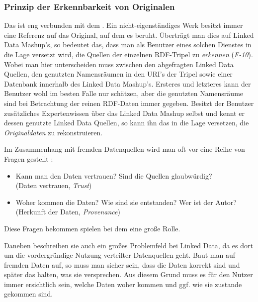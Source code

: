 \documentclass[11pt]{article}
\newcommand{\com}[1]{\marginpar{\em {\small{#1}}}} %
\begin{document}
%
%
\subsubsection{Prinzip der Erkennbarkeit von Originalen}
\label{sec:MashupPrinciple-Original}
\label{req:F10source}

Das  ist eng verbunden mit dem . Ein nicht-eigenständiges Werk besitzt immer eine Referenz auf das Original, auf dem es beruht. Überträgt man dies auf Linked Data Mashup's, so bedeutet das, dass man als Benutzer eines solchen Dienstes in die Lage versetzt wird, die Quellen der einzelnen RDF-Tripel zu \emph{erkennen} (\textit{F-10})\com{Anforderung \\ F-10, S. \pageref{req:F10}}. Wobei man hier unterscheiden muss zwischen den abgefragten Linked Data Quellen, den genutzten Namensräumen in den URI's der Tripel sowie einer Datenbank innerhalb des Linked Data Mashup's. Ersteres und letzteres kann der Benutzer wohl im besten Falle nur schätzen, aber die genutzten Namensräume sind bei Betrachtung der reinen RDF-Daten immer gegeben. Besitzt der Benutzer zusätzliches Expertenwissen über das Linked Data Mashup selbst und kennt er dessen genutzte Linked Data Quellen, so kann ihn das in die Lage versetzen, die \emph{Originaldaten} zu rekonstruieren.

Im Zusammenhang mit fremden Datenquellen wird man oft vor eine Reihe von Fragen gestellt \cite[S. 19]{LINKEDDATA-ABOUT}:

\begin{itemize}
	\item Kann man den Daten vertrauen?\com{Trust} Sind die Quellen glaubwürdig? \\(Daten vertrauen, \textit{Trust})
	\item Woher\com{Provenance} kommen die Daten? Wie sind sie entstanden? Wer ist der Autor? \\(Herkunft der Daten, \textit{Provenance})
\end{itemize} 

\noindent
Diese Fragen bekommen spielen bei dem  eine große Rolle. 


\newpage 
\noindent
Daneben beschreiben sie auch ein großes Problemfeld bei Linked Data, da es dort um die vordergründige Nutzung verteilter Datenquellen geht. Baut man auf fremden Daten auf, so muss man sicher sein, dass die Daten korrekt sind und später das halten, was sie versprechen. Aus diesem Grund muss es für den Nutzer immer ersichtlich sein, welche Daten woher kommen und ggf. wie sie zustande gekommen sind.\\
\end{document}
